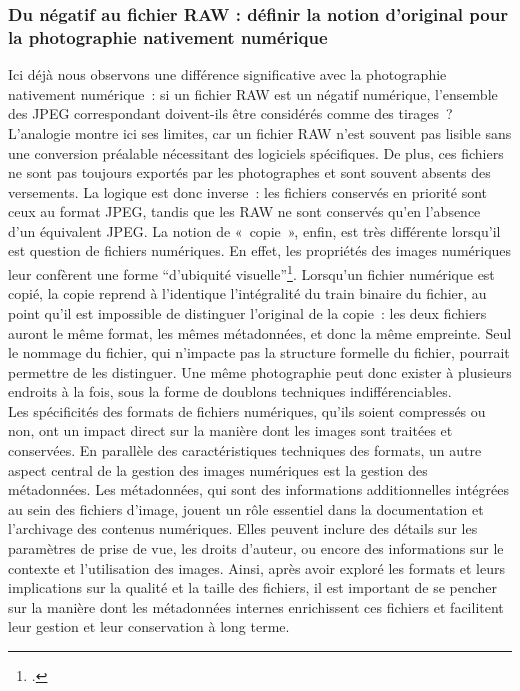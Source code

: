 \subsubsection*{Du négatif au fichier RAW : définir la notion d'original pour la photographie nativement numérique}

Ici déjà nous observons une différence significative avec la photographie nativement numérique : si un fichier RAW est un négatif numérique, l’ensemble des JPEG correspondant doivent-ils être considérés comme des tirages ? L’analogie montre ici ses limites, car un fichier RAW n’est souvent pas lisible sans une conversion préalable nécessitant des logiciels spécifiques. De plus, ces fichiers ne sont pas toujours exportés par les photographes et sont souvent absents des versements. La logique est donc inverse : les fichiers conservés en priorité sont ceux au format JPEG, tandis que les RAW ne sont conservés qu’en l’absence d’un équivalent JPEG. La notion de « copie », enfin, est très différente lorsqu’il est question de fichiers numériques. En effet, les propriétés des images numériques leur confèrent une forme \enquote{d’ubiquité visuelle}\footcite[p.16]{chirolletPenserPhotographieNumerique2015}. Lorsqu’un fichier numérique est copié, la copie reprend à l’identique l’intégralité du train binaire du fichier, au point qu’il est impossible de distinguer l’original de la copie : les deux fichiers auront le même format, les mêmes métadonnées, et donc la même empreinte. Seul le nommage du fichier, qui n’impacte pas la structure formelle du fichier, pourrait permettre de les distinguer. Une même photographie peut donc exister à plusieurs endroits à la fois, sous la forme de doublons techniques indifférenciables. 
\\

Les spécificités des formats de fichiers numériques, qu'ils soient compressés ou non, ont un impact direct sur la manière dont les images sont traitées et conservées. En parallèle des caractéristiques techniques des formats, un autre aspect central de la gestion des images numériques est la gestion des métadonnées. Les métadonnées, qui sont des informations additionnelles intégrées au sein des fichiers d'image, jouent un rôle essentiel dans la documentation et l'archivage des contenus numériques. Elles peuvent inclure des détails sur les paramètres de prise de vue, les droits d'auteur, ou encore des informations sur le contexte et l'utilisation des images. Ainsi, après avoir exploré les formats et leurs implications sur la qualité et la taille des fichiers, il est important de se pencher sur la manière dont les métadonnées internes enrichissent ces fichiers et facilitent leur gestion et leur conservation à long terme.

